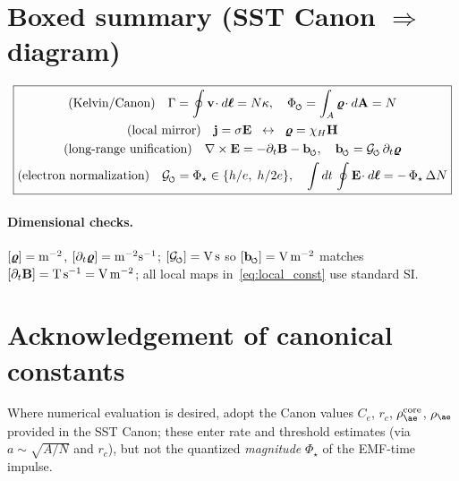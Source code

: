 \documentclass[11pt,a4paper]{article}
\newcommand{\swirlarrow}{%
    \mathchoice{\mkern-2mu\scriptstyle\boldsymbol{\circlearrowleft}}%
    {\mkern-2mu\scriptstyle\boldsymbol{\circlearrowleft}}%
    {\mkern-2mu\scriptscriptstyle\boldsymbol{\circlearrowleft}}%
    {\mkern-2mu\scriptscriptstyle\boldsymbol{\circlearrowleft}}%
}
\begin{document}
\section{Boxed summary (SST Canon $\Rightarrow$ diagram)}
\[
    \boxed{
        \begin{gathered}
        \text{(Kelvin/Canon)}\quad \Gamma=\oint \mathbf v\!\cdot d\boldsymbol\ell = N\kappa, \quad
        \Phi_{\rm \swirlarrow}=\int_A \bm{\varrho}\!\cdot d\mathbf A=N \\
        \text{(local mirror)}\quad \mathbf j=\sigma\mathbf E \;\;\leftrightarrow\;\; \bm{\varrho}=\chi_H\mathbf H \\
        \text{(long-range unification)}\quad \nabla\times\mathbf E = -\partial_t\mathbf B - \mathbf b_{\rm \swirlarrow},\quad
        \mathbf b_{\rm \swirlarrow}=\mathcal G_{\rm \swirlarrow}\,\partial_t\bm{\varrho} \\
        \text{(electron normalization)}\quad \mathcal G_{\rm \swirlarrow}=\Phi_\star \in\{h/e,\;h/2e\},\quad
        \int dt\,\oint \mathbf E\!\cdot d\boldsymbol\ell = -\,\Phi_\star\,\Delta N
        \end{gathered}}
\]

\paragraph{Dimensional checks.}
    $[\bm{\varrho}]={\rm m^{-2}}$, $[\partial_t\bm{\varrho}]={\rm m^{-2}s^{-1}}$; $[\mathcal G_{\rm \swirlarrow}]={\rm V\,s}$ so $[\mathbf b_{\rm \swirlarrow}]={\rm V\,m^{-2}}$ matches $[\partial_t\mathbf B]={\rm T\,s^{-1}}={\rm V\,m^{-2}}$; all local maps in~\eqref{eq:local_const} use standard SI.

\section*{Acknowledgement of canonical constants}
Where numerical evaluation is desired, adopt the Canon values $C_e$, $r_c$, $\rho_{\ae}^{\rm core}$, $\rho_{\ae}$ provided in the SST Canon; these enter rate and threshold estimates (via $a\sim \sqrt{A/N}$ and $r_c$), but not the quantized \emph{magnitude} $\Phi_\star$ of the EMF-time impulse.


\end{document}
